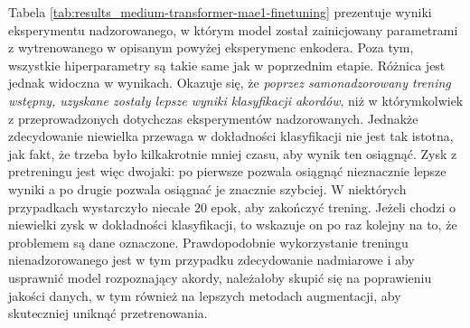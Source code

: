 Tabela \ref{tab:results_medium-transformer-mae1-finetuning} prezentuje wyniki eksperymentu nadzorowanego, w którym model został zainicjowany parametrami z wytrenowanego w opisanym powyżej eksperymenc enkodera. Poza tym, wszystkie hiperparametry są takie same jak w poprzednim etapie. Różnica jest jednak widoczna w wynikach. Okazuje się, że \emph{poprzez samonadzorowany trening wstępny, uzyskane zostały lepsze wyniki klasyfikacji akordów}, niż w którymkolwiek z przeprowadzonych dotychczas eksperymentów nadzorowanych. Jednakże zdecydowanie niewielka przewaga w dokładności klasyfikacji nie jest tak istotna, jak fakt, że trzeba było kilkakrotnie mniej czasu, aby wynik ten osiągnąć. Zysk z pretreningu jest więc dwojaki: po pierwsze pozwala osiągnąć nieznacznie lepsze wyniki a po drugie pozwala osiągnać je znacznie szybciej. W niektórych przypadkach wystarczyło niecałe $20$ epok, aby zakończyć trening. Jeżeli chodzi o niewielki zysk w dokładności klasyfikacji, to wskazuje on po raz kolejny na to, że problemem są dane oznaczone. Prawdopodobnie wykorzystanie treningu nienadzorowanego jest w tym przypadku zdecydowanie nadmiarowe i aby usprawnić model rozpoznający akordy, należałoby skupić się na poprawieniu jakości danych, w tym również na lepszych metodach augmentacji, aby skuteczniej uniknąć przetrenowania.

